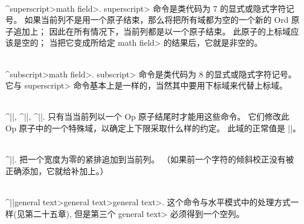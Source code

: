 \\^\<superscript>\<math field>.\enskip
\<superscript> 命令是类代码为 7 的显式或隐式字符记号。%
如果当前列不是用一个原子结束，那么将把所有域都为空的一个新的 Ord 原子追加上；
因此在所有情况下，当前列都是以一个原子结束。%
此原子的上标域应该是空的；
当把它变成所给定 \<math field> 的结果后，它就是非空的。

\\^\<subscript>\<math field>.\enskip
\<subscript> 命令是类代码为 8 的显式或隐式字符记号。%
它与 \<superscript> 命令基本上是一样的，当然其中要用下标域来代替上标域。

\\^|\displaylimits|, ^|\limits|, ^|\nolimits|.\enskip
\1只有当当前列以一个 Op 原子结尾时才能用这些命令。%
它们修改此 Op 原子中的一个特殊域，以确定上下限采取什么样的约定。%
此域的正常值是 |\displaylimits|。

\\^|\/|.\enskip
把一个宽度为零的紧排追加到当前列。%
（如果前一个字符的倾斜校正没有被正确添加，它就给补加上。）

\\^|\discretionary|\<general text>\<general text>\<general text>.
这个命令与水平模式中的处理方式一样(见第二十五章),
但是第三个 \<general text> 必须得到一个空列。

